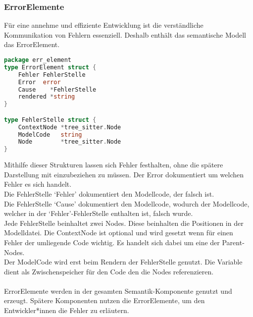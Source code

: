\documentclass[./einleitung.tex]{subfiles}
\begin{document}
    \subsubsection{ErrorElemente}
    Für eine annehme und effiziente Entwicklung ist die verständliche Kommunikation von Fehlern essenziell.
    Deshalb enthält das semantische Modell das ErrorElement.
    \begin{lstlisting}[language=go]
package err_element
type ErrorElement struct {
	Fehler FehlerStelle
	Error  error
	Cause    *FehlerStelle
	rendered *string
}

type FehlerStelle struct {
	ContextNode *tree_sitter.Node
	ModelCode   string
	Node        *tree_sitter.Node
}
    \end{lstlisting}
    Mithilfe dieser Strukturen lassen sich Fehler festhalten, ohne die spätere Darstellung mit einzubeziehen zu müssen.
    Der Error dokumentiert um welchen Fehler es sich handelt. \\
    Die FehlerStelle `Fehler' dokumentiert den Modellcode, der falsch ist. \\
    Die FehlerStelle `Cause' dokumentiert den Modellcode, wodurch der Modellcode, welcher in der `Fehler'-FehlerStelle enthalten ist, falsch wurde. \\
    Jede FehlerStelle beinhaltet zwei Nodes.
    Diese beinhalten die Positionen in der Modelldatei.
    Die ContextNode ist optional und wird gesetzt wenn für einen Fehler der umliegende Code wichtig.
    Es handelt sich dabei um eine der Parent-Nodes. \\
    Der ModelCode wird erst beim Rendern der FehlerStelle genutzt.
    Die Variable dient als Zwischenspeicher für den Code den die Nodes referenzieren. \\ \\
    ErrorElemente werden in der gesamten Semantik-Komponente genutzt und erzeugt.
    Spätere Komponenten nutzen die ErrorElemente, um den Entwickler*innen die Fehler zu erläutern.
\end{document}
